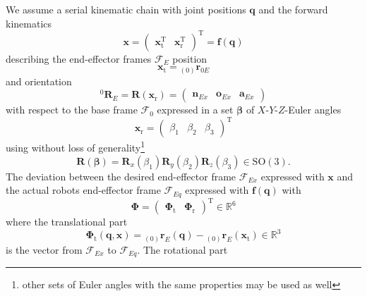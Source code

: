 \documentclass[twocolumn,10pt]{IFTOMM}
\newcommand{\bm}[1]{\boldsymbol{#1}}
\newcommand{\ortvek}[4]{{ }_{(#1)}{\boldsymbol{#2}}^{#3}_{#4} }
\newcommand{\vek}[3]{\boldsymbol{#1}^{#2}_{#3}}
\newcommand{\rotmat}[2]{{{ }^{#1}\boldsymbol{R}}_{#2}}
\newcommand{\transp}[0]{{\mathrm{T}}}
\newcommand{\ks}[1]{{\mathcal{F}}_{#1}}
\begin{document}
We assume a serial kinematic chain with joint positions $\bm{q}$ and the forward kinematics
%
\begin{equation}
\bm{x}
=
\begin{pmatrix}
\bm{x}_{\mathrm{t}}^\transp & \bm{x}_{\mathrm{r}}^\transp
\end{pmatrix}^\transp
=
\bm{f} (\bm{q})
\end{equation}  
%
describing the end-effector frames $\ks{E}$ position 
%
\begin{equation}
\bm{x}_{\mathrm{t}}
=
\ortvek{0}{r}{}{0E}
\label{equ:xt_def}
\end{equation}  
%
and orientation 
%
\begin{equation}
\rotmat{0}{E}=\bm{R}(\bm{x}_{\mathrm{r}})
=
\begin{pmatrix}\vek{n}{}{Ex} & \vek{o}{}{Ex} & \vek{a}{}{Ex}\end{pmatrix}
\end{equation}  
% 
with respect to the base frame $\ks{0}$ expressed in a set $\bm{\beta}$ of $X$-$Y$-$Z$-Euler angles
%
\begin{equation}
\bm{x}_{\mathrm{r}}
=
\begin{pmatrix}
\beta_1  & \beta_2 & \beta_3
\end{pmatrix}^{\mathrm{T}}
\label{equ:xr_def}
\end{equation} 
%
using without loss of generality\footnote{other sets of Euler angles with the same properties may be used as well}
%
\begin{equation}
\bm{R}(\bm{\beta}) = \bm{R}_x(\beta_1) \bm{R}_y(\beta_2) \bm{R}_z(\beta_3) \in \mathrm{SO(3)}.
\label{equ:def_rmat_xyz}
\end{equation}
%
The deviation between the desired end-effector frame $\ks{Ex}$ expressed with $\bm{x}$ and the actual robots end-effector frame $\ks{Eq}$ expressed with $\bm{f}(\bm{q})$ with 
%
\begin{equation}
\bm{\Phi}=\begin{pmatrix}
\bm{\Phi}_{\mathrm{t}} & \bm{\Phi}_{\mathrm{r}}
\end{pmatrix}^\transp \in {\mathbb{R}}^{6}
\label{equ:Phi_def}
\end{equation}
%
where the translational part 
%
\begin{equation}
\bm{\Phi}_{\mathrm{t}}(\bm{q},\bm{x}) = \ortvek{0}{r}{}{E}(\bm{q}) - \ortvek{0}{r}{}{E}(\bm{x}_{\mathrm{t}}) \in {\mathbb{R}}^{3}
\label{equ:Phit_def}
\end{equation}
%
is the vector from $\ks{Ex}$ to $\ks{Eq}$.
The rotational part
\end{document}
